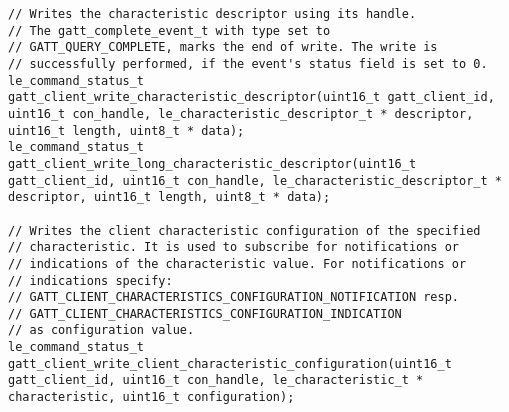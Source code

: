 \begin{lstlisting}
// Writes the characteristic descriptor using its handle.
// The gatt_complete_event_t with type set to
// GATT_QUERY_COMPLETE, marks the end of write. The write is
// successfully performed, if the event's status field is set to 0.
le_command_status_t gatt_client_write_characteristic_descriptor(uint16_t gatt_client_id, uint16_t con_handle, le_characteristic_descriptor_t * descriptor, uint16_t length, uint8_t * data);
le_command_status_t gatt_client_write_long_characteristic_descriptor(uint16_t gatt_client_id, uint16_t con_handle, le_characteristic_descriptor_t * descriptor, uint16_t length, uint8_t * data);

// Writes the client characteristic configuration of the specified 
// characteristic. It is used to subscribe for notifications or 
// indications of the characteristic value. For notifications or 
// indications specify:
// GATT_CLIENT_CHARACTERISTICS_CONFIGURATION_NOTIFICATION resp. 
// GATT_CLIENT_CHARACTERISTICS_CONFIGURATION_INDICATION 
// as configuration value.
le_command_status_t gatt_client_write_client_characteristic_configuration(uint16_t gatt_client_id, uint16_t con_handle, le_characteristic_t * characteristic, uint16_t configuration);
\end{lstlisting}
\pagebreak
